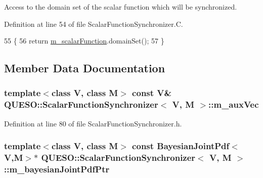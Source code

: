 Access to the domain set of the scalar function which will be synchronized. 



Definition at line 54 of file Scalar\-Function\-Synchronizer.\-C.


\begin{DoxyCode}
55 \{
56   \textcolor{keywordflow}{return} \hyperlink{class_q_u_e_s_o_1_1_scalar_function_synchronizer_a6b24acdd3185e57cae74e6d5aedb90bf}{m\_scalarFunction}.domainSet();
57 \}
\end{DoxyCode}


\subsection{Member Data Documentation}
\hypertarget{class_q_u_e_s_o_1_1_scalar_function_synchronizer_adbd43aee6de557012924f3e18660a4f3}{
\subsubsection[{m\-\_\-aux\-Vec}]{\setlength{\rightskip}{0pt plus 5cm}template$<$class V, class M$>$ const V\& {\bf Q\-U\-E\-S\-O\-::\-Scalar\-Function\-Synchronizer}$<$ V, M $>$\-::m\-\_\-aux\-Vec\hspace{0.3cm}{\ttfamily [private]}}}\label{class_q_u_e_s_o_1_1_scalar_function_synchronizer_adbd43aee6de557012924f3e18660a4f3}


Definition at line 80 of file Scalar\-Function\-Synchronizer.\-h.

\hypertarget{class_q_u_e_s_o_1_1_scalar_function_synchronizer_a0e17d294521cd22b297374ae2ff7f463}{
\subsubsection[{m\-\_\-bayesian\-Joint\-Pdf\-Ptr}]{\setlength{\rightskip}{0pt plus 5cm}template$<$class V, class M$>$ const {\bf Bayesian\-Joint\-Pdf}$<$V,M$>$$\ast$ {\bf Q\-U\-E\-S\-O\-::\-Scalar\-Function\-Synchronizer}$<$ V, M $>$\-::m\-\_\-bayesian\-Joint\-Pdf\-Ptr\hspace{0.3cm}{\ttfamily [private]}}}\label{class_q_u_e_s_o_1_1_scalar_function_synchronizer_a0e17d294521cd22b297374ae2ff7f463}


